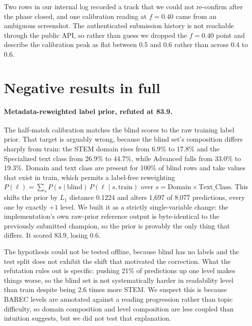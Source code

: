 Two rows in our internal log recorded a track that we could not re-confirm after the phase
closed, and one calibration reading at $f = 0.40$ came from an ambiguous screenshot. The
authenticated submission history is not reachable through the public API, so rather than
guess we dropped the $f = 0.40$ point and describe the calibration peak as flat between 0.5
and 0.6 rather than across 0.4 to 0.6.

\section{Negative results in full}
\label{app:negative}

\paragraph{Metadata-reweighted label prior, refuted at 83.9.} The half-match calibration
matches the blind scores to the raw training label prior. That target is arguably wrong,
because the blind set's composition differs sharply from train: the STEM domain rises from
6.9\% to 17.8\% and the Specialized text class from 26.9\% to 44.7\%, while Advanced falls
from 33.0\% to 19.3\%. Domain and text class are present for 100\% of blind rows and take
values that exist in train, which permits a label-free reweighting
$P(\ell) = \sum_s P(s \mid \text{blind}) \, P(\ell \mid s, \text{train})$ over
$s = \text{Domain} \times \text{Text\_Class}$. This shifts the prior by $L_1$ distance
0.1224 and alters 1{,}697 of 8{,}077 predictions, every one by exactly $+1$ level. We built
it as a strictly single-variable change: the implementation's own raw-prior reference output
is byte-identical to the previously submitted champion, so the prior is provably the only
thing that differs. It scored 83.9, losing 0.6.

The hypothesis could not be tested offline, because blind has no labels and the test split
does not exhibit the shift that motivated the correction. What the refutation rules out is
specific: pushing 21\% of predictions up one level makes things worse, so the blind set is
not systematically harder in readability level than train despite being 2.6 times more STEM.
We suspect this is because BAREC levels are annotated against a reading progression rather
than topic difficulty, so domain composition and level composition are less coupled than
intuition suggests, but we did not test that explanation.

